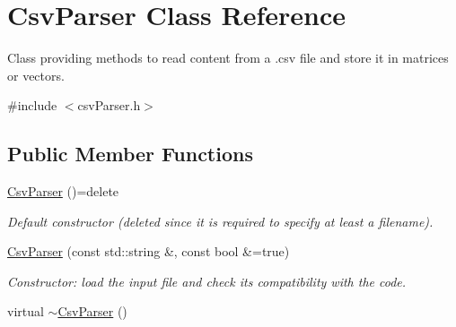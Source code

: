 \hypertarget{classCsvParser}{\section{Csv\-Parser Class Reference}
\label{classCsvParser}
}


Class providing methods to read content from a .csv file and store it in matrices or vectors.  




{\ttfamily \#include $<$csv\-Parser.\-h$>$}

\subsection*{Public Member Functions}
\begin{DoxyCompactItemize}
\item 
\hypertarget{classCsvParser_a9694abc21c2bc6d593a2489f6896ca10}{\hyperlink{classCsvParser_a9694abc21c2bc6d593a2489f6896ca10}{Csv\-Parser} ()=delete}\label{classCsvParser_a9694abc21c2bc6d593a2489f6896ca10}

\begin{DoxyCompactList}\small\item\em Default constructor (deleted since it is required to specify at least a filename). \end{DoxyCompactList}\item 
\hyperlink{classCsvParser_a928811b407ea6816bab9fef75d504301}{Csv\-Parser} (const std\-::string \&, const bool \&=true)
\begin{DoxyCompactList}\small\item\em Constructor\-: load the input file and check its compatibility with the code. \end{DoxyCompactList}\item 
\hypertarget{classCsvParser_a73aa36f7e9a832f184c98873c930e83e}{virtual \hyperlink{classCsvParser_a73aa36f7e9a832f184c98873c930e83e}{$\sim$\-Csv\-Parser} ()}\label{classCsvParser_a73aa36f7e9a832f184c98873c930e83e}


\end{DoxyCompactItemize}
